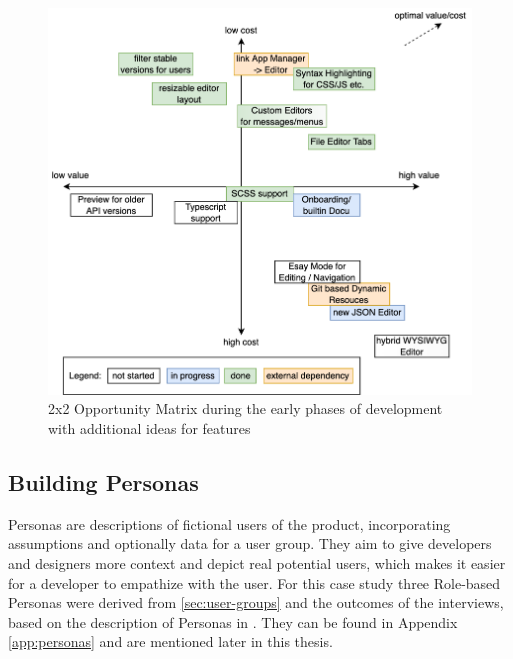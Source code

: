 \begin{figure}[h!]
	\centering
  \includegraphics[width=\textwidth]{pics/feature_cost_matrix.drawio.png}
	\caption{2x2 Opportunity Matrix during the early phases of development with additional ideas for features}
	\label{fig:opportunitymatrix}
\end{figure}


\subsection{Building Personas}
\label{subsec:personas}

Personas are descriptions of fictional users of the product, incorporating assumptions and optionally data for a user group.
They aim to give developers and designers more context and depict real potential users, which makes it easier for a developer to empathize with the user.
For this case study three Role-based Personas were derived from \ref{sec:user-groups} and the outcomes of the interviews, based on the description of Personas in \cite[pp. 403-405]{Interactiondesign:2019ys}. They can be found in Appendix \ref{app:personas} and are mentioned later in this thesis.
